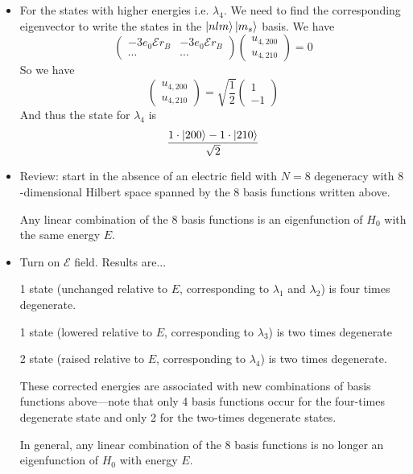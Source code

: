 \documentclass[11pt, a4paper]{article}
\newcommand{\E}{\mathcal{E}}  %
\begin{document}
\begin{itemize}
	\item For the states with higher energies i.e. $ \lambda_{4} $. We need to find the corresponding eigenvector to write the states in the $ \ket{nlm}\ket{m_{s}} $ basis. We have
		\begin{equation*}
			\begin{pmatrix}
			-3e_{0}\E r_{B} & -3e_{0}\E r_{B} \\
			\cdots  & \cdots
			\end{pmatrix}
			\begin{pmatrix}
				u_{4, 200}\\
				u_{4, 210}
			\end{pmatrix}
			 = 0
		\end{equation*}
		So we have
		\begin{equation*}
			\begin{pmatrix}
				u_{4, 200}\\
				u_{4, 210}
			\end{pmatrix} 
			 = \sqrt{\frac{1}{2}}
			 \begin{pmatrix}
			 1\\
			 -1
			 \end{pmatrix}
		\end{equation*}
		And thus the state for $ \lambda_{4} $ is
		\begin{equation*}
			\frac{1\cdot \ket{200} - 1\cdot \ket{210}}{\sqrt{2}}
		\end{equation*}
		
		\item Review: start in the absence of an electric field with $ N = 8 $ degeneracy with $ 8 $-dimensional Hilbert space spanned by the 8 basis functions written above.
		
		Any linear combination of the 8 basis functions  is an eigenfunction of $ H_{0} $ with the  same energy $ E $.
		
		\item Turn on $ \E $ field. Results are...
		
		1 state (unchanged relative to $ E $, corresponding to $ \lambda_{1} $ and $ \lambda_{2} $) is four times degenerate.
		
		1 state (lowered relative to $ E $, corresponding to $ \lambda_{3} $) is two times degenerate
		
		2 state (raised relative to $ E $,  corresponding to $ \lambda_{4} $) is two times degenerate.
		
		These corrected energies are associated with new combinations of basis functions above---note that only 4 basis functions occur for the four-times degenerate state and only 2 for the two-times degenerate states. 
		
		In general, any linear combination of the 8 basis functions  is no longer an eigenfunction of $ H_{0} $ with energy $ E $.
	
\end{itemize}
\end{document}

